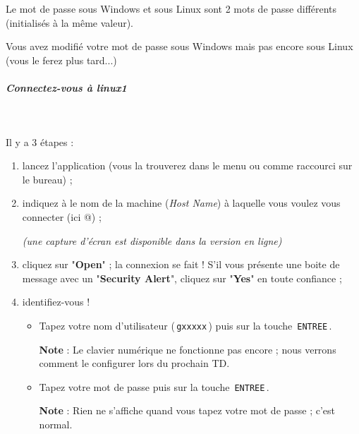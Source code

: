 \documentclass[11pt,a4paper]{article}
\begin{document}
					Le mot de passe sous Windows et sous Linux sont 2 mots de passe diff\'erents (initialis\'es \`a la m\^eme valeur).
        
            \par
        
					Vous avez modifi\'e votre mot de passe sous Windows mais pas encore sous Linux (vous le ferez plus tard...)
				
            \par
        
			
		\subparagraph{Connectez-vous \`a linux1} 
		
					\textcolor{white}{.} \par
				
            \par
        Il y a 3 \'etapes :
            \par
        
					\begin{enumerate}
				
			\item 
						lancez l'application \verb@putty@
						(vous la trouverez dans le menu ou comme raccourci sur le bureau) ;
					
			\item 
						indiquez \`a \verb@putty@ le nom de la machine
						(\textit{Host Name}) 
						\`a laquelle vous voulez vous connecter
						(ici @) ;
						 {\footnotesize\emph{(une capture d'\'ecran est disponible dans la version en ligne)}\par} 
			\item 
						cliquez sur "\textbf{Open}" ; 
						la connexion se fait !
						S'il vous pr\'esente une boite de message avec un "\textbf{Security Alert}", 
						cliquez sur "\textbf{Yes}" en toute confiance ;
					
			\item 
						identifiez-vous !
						
					\begin{itemize}
				
			\item 
								Tapez votre nom d'utilisateur 
								(\,\verb|gxxxxx|\,) 
								puis sur la touche \,\verb|ENTREE|\,.\par
				\textbf{Note} :
								Le clavier num\'erique ne fonctionne pas encore ; nous verrons comment le configurer lors du prochain TD.
							
					\end{itemize}
				
					\begin{itemize}
				
			\item 
								Tapez votre mot de passe puis sur la touche \,\verb|ENTREE|\,.\par
				\textbf{Note} :
								Rien ne s'affiche quand vous tapez votre mot de passe ; c'est normal.
							
					\end{itemize}
				
					\end{enumerate}
\end{document}
